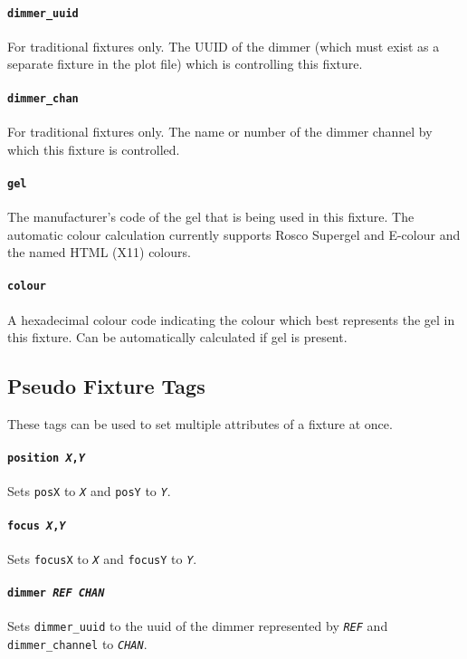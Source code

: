 \documentclass[a4paper]{article}
\begin{document}
\paragraph{\texttt{dimmer\_uuid}}
For traditional fixtures only. The UUID of the dimmer (which must exist as a 
separate fixture in the plot file) which is controlling this fixture.

\paragraph{\texttt{dimmer\_chan}}
For traditional fixtures only. The name or number of the dimmer channel by 
which this fixture is controlled. 

\paragraph{\texttt{gel}}
The manufacturer's code of the gel that is being used in this fixture. The 
automatic colour calculation currently supports Rosco Supergel and E-colour 
and the named HTML (X11) colours.

\paragraph{\texttt{colour}}
A hexadecimal colour code indicating the colour which best represents the gel 
in this fixture. Can be automatically calculated if gel is present.

\subsection{Pseudo Fixture Tags}
These tags can be used to set multiple attributes of a fixture at once.

\paragraph{\texttt{position \textit{X},\textit{Y}}}
Sets \texttt{posX} to \texttt{\textit{X}} and \texttt{posY} to 
\texttt{\textit{Y}}.

\paragraph{\texttt{focus \textit{X},\textit{Y}}}
Sets \texttt{focusX} to \texttt{\textit{X}} and \texttt{focusY} to 
\texttt{\textit{Y}}.

\paragraph{\texttt{dimmer \textit{REF} \textit{CHAN}}}
Sets \texttt{dimmer\_uuid} to the uuid of the dimmer represented by 
\texttt{\textit{REF}} and \texttt{dimmer\_channel} to \texttt{\textit{CHAN}}.
\end{document}
